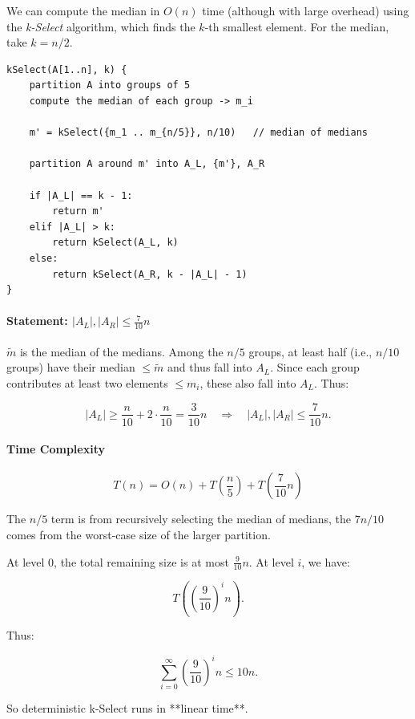 \documentclass{article}
\begin{document}
We can compute the median in $O(n)$ time (although with large overhead) using the \textit{k-Select} algorithm, which finds the $k$-th smallest element.  
For the median, take $k = n/2$.

\begin{verbatim}
kSelect(A[1..n], k) {
    partition A into groups of 5
    compute the median of each group -> m_i

    m' = kSelect({m_1 .. m_{n/5}}, n/10)   // median of medians

    partition A around m' into A_L, {m'}, A_R

    if |A_L| == k - 1:
        return m'
    elif |A_L| > k:
        return kSelect(A_L, k)
    else:
        return kSelect(A_R, k - |A_L| - 1)
}
\end{verbatim}

\paragraph{Statement: $|A_L|, |A_R| \le \frac{7}{10}n$}

$\tilde{m}$ is the median of the medians.  
Among the $n/5$ groups, at least half (i.e., $n/10$ groups) have their median $\le \tilde{m}$ and thus fall into $A_L$.  
Since each group contributes at least two elements $\le m_i$, these also fall into $A_L$.  
Thus:

\[
|A_L| \ge \frac{n}{10} + 2\cdot\frac{n}{10} = \frac{3}{10}n
\quad\Rightarrow\quad
|A_L|, |A_R| \le \frac{7}{10}n.
\]

\paragraph{Time Complexity}

\[
T(n) = O(n) + T\!\left(\frac{n}{5}\right) + T\!\left(\frac{7}{10}n\right)
\]

The $n/5$ term is from recursively selecting the median of medians,  
the $7n/10$ comes from the worst-case size of the larger partition.

At level $0$, the total remaining size is at most $\frac{9}{10}n$.  
At level $i$, we have:

\[
T\!\left(\left(\frac{9}{10}\right)^i n\right).
\]

Thus:

\[
\sum_{i=0}^{\infty} \left(\frac{9}{10}\right)^i n \le 10n.
\]

So deterministic k-Select runs in **linear time**.
\end{document}
